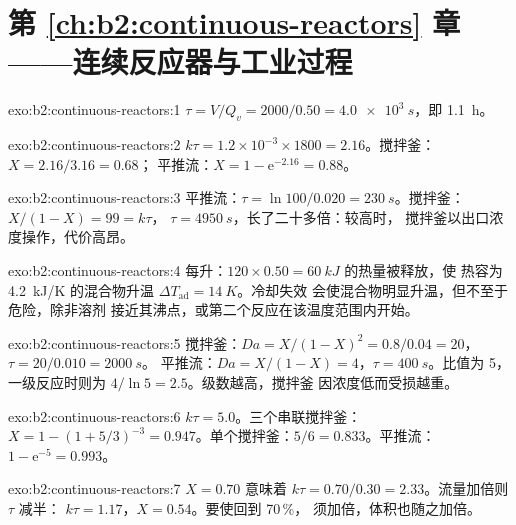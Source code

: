 \section*{第 \ref{ch:b2:continuous-reactors} 章——连续反应器与工业过程}

\begin{solution}{exo:b2:continuous-reactors:1}
$\tau = V/Q_v = 2000/0.50 = \qty{4.0e3}{s}$，即 \qty{1.1}{h}。
\end{solution}

\begin{solution}{exo:b2:continuous-reactors:2}
$k\tau = 1.2 \times 10^{-3} \times 1800 = 2.16$。搅拌釜：$X = 2.16/3.16 = 0.68$；
平推流：$X = 1 - \mathrm e^{-2.16} = 0.88$。
\end{solution}

\begin{solution}{exo:b2:continuous-reactors:3}
平推流：$\tau = \ln 100/0.020 = \qty{230}{s}$。搅拌釜：$X/(1 - X) = 99 = k\tau$，
$\tau = \qty{4950}{s}$，长了二十多倍：较高时，
搅拌釜以出口浓度操作，代价高昂。
\end{solution}

\begin{solution}{exo:b2:continuous-reactors:4}
每升：$120 \times 0.50 = \qty{60}{kJ}$ 的热量被释放，使
热容为 \qty{4.2}{kJ/K} 的混合物升温 $\Delta T_{\text{ad}} = \qty{14}{K}$。冷却失效
会使混合物明显升温，但不至于危险，除非溶剂
接近其沸点，或第二个反应在该温度范围内开始。
\end{solution}

\begin{solution}{exo:b2:continuous-reactors:5}
搅拌釜：$Da = X/(1 - X)^2 = 0.8/0.04 = 20$，$\tau = 20/0.010 = \qty{2000}{s}$。
平推流：$Da = X/(1 - X) = 4$，$\tau = \qty{400}{s}$。比值为 5，一级反应时则为 $4/\ln 5 =
2.5$。级数越高，搅拌釜
因浓度低而受损越重。
\end{solution}

\begin{solution}{exo:b2:continuous-reactors:6}
$k\tau = 5.0$。三个串联搅拌釜：$X = 1 - (1 + 5/3)^{-3} = 0.947$。单个搅拌釜：$5/6 =
0.833$。平推流：$1 - \mathrm e^{-5} = 0.993$。
\end{solution}

\begin{solution}{exo:b2:continuous-reactors:7}
$X = 0.70$ 意味着 $k\tau = 0.70/0.30 = 2.33$。流量加倍则 $\tau$ 减半：
$k\tau = 1.17$，$X = 0.54$。要使回到 70\,\%，
须加倍，体积也随之加倍。
\end{solution}

